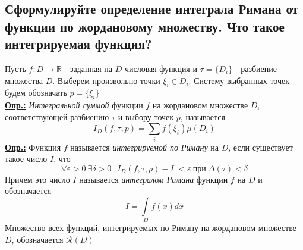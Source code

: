 
\subsection{Сформулируйте определение интеграла Римана от функции по жордановому множеству. Что такое интегрируемая функция?}

Пусть $f: D \rightarrow \mathbb{R}$ - заданная на $D$ числовая функция и $\tau = \{D_i\}$ - разбиение множества $D$. Выберем произвольно точки $\xi_i \in D_i$. Систему выбранных точек будем обозначать $p = \{\xi_i\}$ \\
\textbf{\underline{Опр.:} } \textit{Интегральной суммой} функции $f$ на жордановом множестве $D$, соответствующей разбиению $\tau$ и выбору точек $p$, называется 
\[I_D(f, \tau, p) = \sum\limits_if(\xi_i)\mu(D_i)\]
\textbf{\underline{Опр.:} } Функция $f$ называется \textit{интегрируемой по Риману} на $D$, если существует такое число $I$, что
\[\forall \varepsilon > 0 \ \exists \delta > 0 \ \ |I_D(f, \tau, p) - I| < \varepsilon \ \text{при} \ \Delta(\tau) < \delta\]
Причем это число $I$ называется \textit{интегралом Римана} функции $f$ на $D$ и обозначается
\[I = \int\limits_Df(x)dx\]
Множество всех функций, интегрируемых по Риману на жордановом множестве $D$, обозначается $\mathcal{R}(D)$

